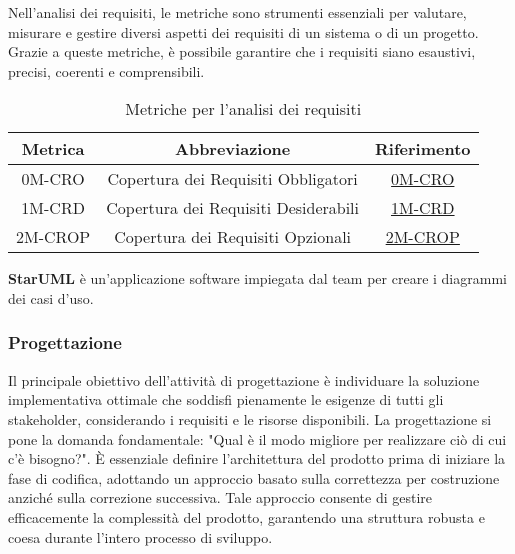 Nell'analisi dei requisiti, le metriche sono strumenti essenziali per valutare, misurare e gestire diversi aspetti dei requisiti di un sistema o di un progetto. Grazie a queste metriche, è possibile garantire che i requisiti siano esaustivi, precisi, coerenti e comprensibili.
\\
\begin{table}[!h]
    \centering
    \begin{tabular}{|c|c|c|}
    \hline
    \textbf{Metrica} & \textbf{Abbreviazione} & \textbf{Riferimento} \\
    \hline
    0M-CRO & Copertura dei Requisiti Obbligatori & \hyperlink{subsection.6.2}{0M-CRO} \\
    1M-CRD & Copertura dei Requisiti Desiderabili & \hyperlink{subsection.6.2}{1M-CRD} \\
    2M-CROP & Copertura dei Requisiti Opzionali & \hyperlink{subsection.6.2}{2M-CROP} \\
    \hline
    \end{tabular}
    \caption{Metriche per l'analisi dei requisiti}
    \label{tab:2}
\end{table}

\textbf{StarUML} è un'applicazione software impiegata dal team per creare i diagrammi dei casi d'uso.


\subsubsection{Progettazione}
Il principale obiettivo dell'attività di progettazione è individuare la soluzione implementativa ottimale che soddisfi pienamente le esigenze di tutti gli stakeholder, considerando i requisiti e le risorse disponibili. La progettazione si pone la domanda fondamentale: "Qual è il modo migliore per realizzare ciò di cui c'è bisogno?". È essenziale definire l'architettura del prodotto prima di iniziare la fase di codifica, adottando un approccio basato sulla correttezza per costruzione anziché sulla correzione successiva. Tale approccio consente di gestire efficacemente la complessità del prodotto, garantendo una struttura robusta e coesa durante l'intero processo di sviluppo.


